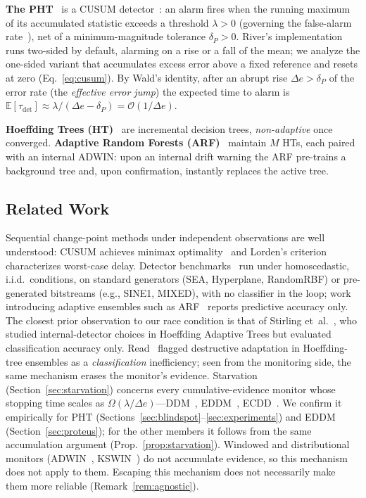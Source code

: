 \documentclass[10pt,conference]{IEEEtran}
\theoremstyle{definition}
\begin{document}
\noindent\textbf{The PHT}~\cite{page_1954} is a CUSUM detector~\cite{basseville_1993}: an alarm fires when the running maximum of its accumulated statistic exceeds a threshold $\lambda > 0$ (governing the false-alarm rate~\cite{tartakovsky_2014}), net of a minimum-magnitude tolerance $\delta_P > 0$. River's implementation runs two-sided by default, alarming on a rise or a fall of the mean; we analyze the one-sided variant that accumulates excess error above a fixed reference and resets at zero (Eq.~\eqref{eq:cusum}). By Wald's identity, after an abrupt rise $\Delta e > \delta_P$ of the error rate (the \emph{effective error jump}) the expected time to alarm is $\mathbb{E}[\tau_{\mathrm{det}}] \approx \lambda / (\Delta e - \delta_P) = \mathcal{O}(1/\Delta e)$.

\noindent\textbf{Hoeffding Trees (HT)}~\cite{gama_survey_2014} are incremental decision trees, \emph{non-adaptive} once converged. \textbf{Adaptive Random Forests (ARF)}~\cite{gomes_arf_2017} maintain $M$ HTs, each paired with an internal ADWIN: upon an internal drift warning the ARF pre-trains a background tree and, upon confirmation, instantly replaces the active tree.

\subsection{Related Work}\label{sec:related}
Sequential change-point methods under independent observations are well understood: CUSUM achieves minimax optimality~\cite{moustakides_1986} and Lorden's criterion~\cite{lorden_1971} characterizes worst-case delay.
Detector benchmarks~\cite{goncalves_2014, lukats_2025} run under homoscedastic, i.i.d.\ conditions, on standard generators (SEA, Hyperplane, RandomRBF) or pre-generated bitstreams (e.g., SINE1, MIXED), with no classifier in the loop; work introducing adaptive ensembles such as ARF~\cite{gomes_arf_2017} reports predictive accuracy only.
The closest prior observation to our race condition is that of Stirling et~al.~\cite{stirling_2018}, who studied internal-detector choices in Hoeffding Adaptive Trees but evaluated classification accuracy only. Read~\cite{read_2018} flagged destructive adaptation in Hoeffding-tree ensembles as a \emph{classification} inefficiency; seen from the monitoring side, the same mechanism erases the monitor's evidence. Starvation (Section~\ref{sec:starvation}) concerns every cumulative-evidence monitor whose stopping time scales as $\Omega(\lambda / \Delta e)$---DDM~\cite{gama_ddm_2004}, EDDM~\cite{baena_eddm_2006}, ECDD~\cite{ross_ecdd_2012}. We confirm it empirically for PHT (Sections~\ref{sec:blindspot}--\ref{sec:experiments}) and EDDM (Section~\ref{sec:proteus}); for the other members it follows from the same accumulation argument (Prop.~\ref{prop:starvation}). Windowed and distributional monitors (ADWIN~\cite{bifet_adwin_2007}, KSWIN~\cite{raab_kswin_2020}) do not accumulate evidence, so this mechanism does not apply to them. Escaping this mechanism does not necessarily make them more reliable (Remark~\ref{rem:agnostic}).
\end{document}
